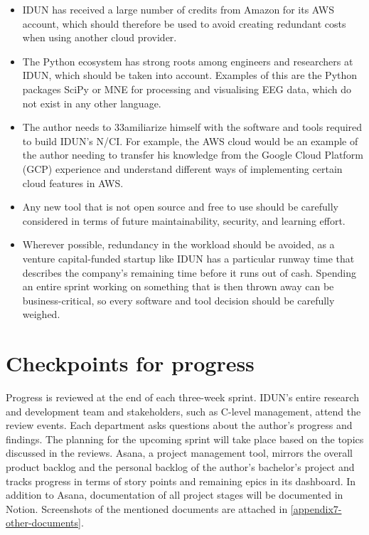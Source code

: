 \begin{itemize}
  \item IDUN has received a large number of credits from Amazon for its AWS account, which should therefore be used to avoid creating redundant costs when using another cloud provider.
  \item The Python ecosystem has strong roots among engineers and researchers at IDUN, which should be taken into account. Examples of this are the Python packages SciPy or MNE for processing and visualising EEG data, which do not exist in any other language.
  \item The author needs to 33amiliarize himself with the software and tools required to build IDUN’s N/CI. For example, the AWS cloud would be an example of the author needing to transfer his knowledge from the Google Cloud Platform (GCP) experience and understand different ways of implementing certain cloud features in AWS.
  \item Any new tool that is not open source and free to use should be carefully considered in terms of future maintainability, security, and learning effort.
  \item Wherever possible, redundancy in the workload should be avoided, as a venture capital-funded startup like IDUN has a particular runway time that describes the company’s remaining time before it runs out of cash. Spending an entire sprint working on something that is then thrown away can be business-critical, so every software and tool decision should be carefully weighed.
\end{itemize}

\section{Checkpoints for progress}
\label{chapter3-checkpoints-for-progress}

Progress is reviewed at the end of each three-week sprint. IDUN’s entire research and development team and stakeholders, such as C-level management, attend the review events. Each department asks questions about the author’s progress and findings. The planning for the upcoming sprint will take place based on the topics discussed in the reviews. Asana, a project management tool, mirrors the overall product backlog and the personal backlog of the author’s bachelor’s project and tracks progress in terms of story points and remaining epics in its dashboard. In addition to Asana, documentation of all project stages will be documented in Notion. Screenshots of the mentioned documents are attached in \autoref{appendix7-other-documents}.

